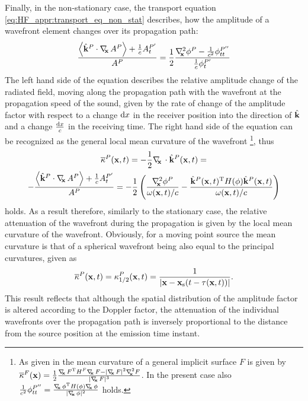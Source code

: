 Finally, in the non-stationary case, the transport equation \eqref{eq:HF_appr:transport_eq_non_stat} describes, how the amplitude of a wavefront element changes over its propagation path:
\begin{equation}
\frac{ \left< \hat{\mathbf{k}}^P \cdot \nabla_{\!\!\mathbf{x}}\, A^P \right>+\frac{1}{c} A^{P'}_t }{A^P}  = \frac{1}{2} \frac{ \nabla^2_{\!\!\mathbf{x}} \phi^P - \frac{1}{c^2} \phi^{P''}_{tt} }{\frac{1}{c}\phi^{P'}_t}
\end{equation}
The left hand side of the equation describes the relative amplitude change of the radiated field, moving along the propagation path with the wavefront at the propagation speed of the sound, given by the rate of change of the amplitude factor with respect to a change $\mathrm{d} x$ in the receiver position into the direction of $\hat{\mathbf{k}}$ and a change $\frac{\mathrm{d} x}{c}$ in the receiving time. 
The right hand side of the equation can be recognized as the general local mean curvature of the wavefront \cite[4.2]{Goldman2005}\footnote{As given in \cite{Goldman2005} the mean curvature of a general implicit surface $F$ is given by 
$\overline{\kappa}^F(\vx) = \frac{1}{2}\frac{\Dx F^{\mathrm{T}} H^F \Dx F - |\Dx F|^2 \Lx F }{|\Dx F|^3}$. In the present case also $\frac{1}{c^2} \phi^{P''}_{tt} = \frac{\nabla_{\!\!\mathbf{x}}\, \phi^{\mathrm{T}} H(\phi) \nabla_{\!\!\mathbf{x}}\, \phi}{|\nabla_{\!\!\mathbf{x}}\, \phi|^2}$ holds.}, thus
\begin{multline}
\overline{\kappa}^P(\mathbf{x},t) = -\frac{1}{2}\nabla_{\!\!\mathbf{x}}\, \cdot \hat{\mathbf{k}}^P(\mathbf{x},t)= \\
-\frac{ \left< \hat{\mathbf{k}}^P \cdot \nabla_{\!\!\mathbf{x}}\, A^P \right>+\frac{1}{c} A^{P'}_t }{A^P} = -\frac{1}{2} \left( \frac{ \nabla^2_{\!\!\mathbf{x}} \phi^P  }{ \omega(\mathbf{x},t)/c } - \frac{ \hat{\mathbf{k}}^P(\mathbf{x},t)^{\mathrm{T}} H(\phi) \hat{\mathbf{k}}^P(\mathbf{x},t) }{ \omega(\mathbf{x},t)/c } \right)
\label{Eq:Moving_source:attenuation}
\end{multline}
holds.
As a result therefore, similarly to the stationary case, the relative attenuation of the wavefront during the propagation is given by the local mean curvature of the wavefront.
Obviously, for a moving point source the mean curvature is that of a spherical wavefront being also equal to the principal curvatures, given as
\begin{equation}
\overline{\kappa}^P(\mathbf{x},t) = \kappa^P_{1/2}(\mathbf{x},t) = \frac{1}{|\mathbf{x}-\mathbf{x}_{\mathrm{s}}(t-\tau(\mathbf{x},t))|}.
\label{Eq:Moving_source:attenuation_2}
\end{equation}
This result reflects that although the spatial distribution of the amplitude factor is altered according to the Doppler factor, the attenuation of the individual wavefronts over the propagation path is inversely proportional to the distance from the source position at the emission time instant.

